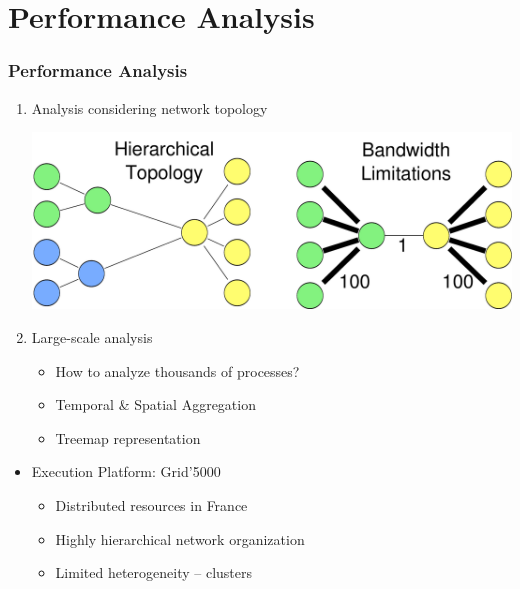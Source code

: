 \section{Performance Analysis}




%

\frame
{
   \frametitle{Performance Analysis}

   \begin{enumerate}
   \item Analysis considering network topology

      \begin{minipage}{\textwidth}
      \centering
      \includegraphics[width=.8\textwidth]{img/analysis-net.pdf}
      \end{minipage}

\vfill

   \item Large-scale analysis
	\begin{itemize}
	\item How to analyze thousands of processes?
	\item Temporal \& Spatial Aggregation
	\item Treemap representation
	\end{itemize}
   \end{enumerate}

   \begin{itemize}
   \item Execution Platform: Grid'5000
      \begin{itemize}
      \item Distributed resources in France
      \item Highly hierarchical network organization
      \item Limited heterogeneity -- clusters
      \end{itemize}
   \end{itemize}
}






